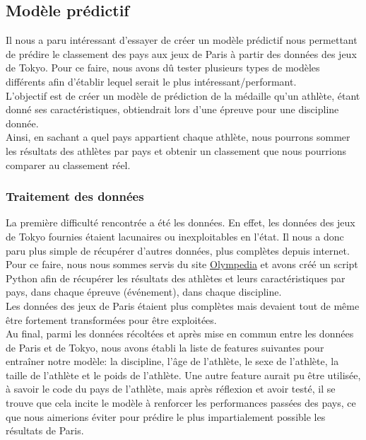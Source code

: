 \documentclass{article}
\begin{document}
\subsection{Modèle prédictif}

Il nous a paru intéressant d'essayer de créer un modèle prédictif nous permettant de prédire le classement des pays aux jeux de Paris à partir des données des jeux de Tokyo. Pour ce faire, nous avons dû tester plusieurs types de modèles différents afin d'établir lequel serait le plus intéressant/performant.
\\

L'objectif est de créer un modèle de prédiction de la médaille qu'un athlète, étant donné ses caractéristiques, obtiendrait lors d'une épreuve pour une discipline donnée.
\\

Ainsi, en sachant a quel pays appartient chaque athlète, nous pourrons sommer les résultats des athlètes par pays et obtenir un classement que nous pourrions comparer au classement réel.

\subsubsection{Traitement des données}

La première difficulté rencontrée a été les données. En effet, les données des jeux de Tokyo fournies étaient lacunaires ou inexploitables en l'état. Il nous a donc paru plus simple de récupérer d'autres données, plus complètes depuis internet. Pour ce faire, nous nous sommes servis du site \href{https://www.olympedia.org/}{Olympedia} et avons créé un script Python afin de récupérer les résultats des athlètes et leurs caractéristiques par pays, dans chaque épreuve (événement), dans chaque discipline.
\\

Les données des jeux de Paris étaient plus complètes mais devaient tout de même être fortement transformées pour être exploitées.
\\

Au final, parmi les données récoltées et après mise en commun entre les données de Paris et de Tokyo, nous avons établi la liste de features suivantes pour entraîner notre modèle: la discipline, l'âge de l'athlète, le sexe de l'athlète, la taille de l'athlète et le poids de l'athlète. Une autre feature aurait pu être utilisée, à savoir le code du pays de l'athlète, mais après réflexion et avoir testé, il se trouve que cela incite le modèle à renforcer les performances passées des pays, ce que nous aimerions éviter pour prédire le plus impartialement possible les résultats de Paris.
\\
\end{document}
